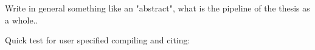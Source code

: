 

Write in general something like an "abstract", what is the pipeline of the thesis as a whole..

Quick test for user specified compiling and citing:\\
\cite{lutkepohl1996specification}\\
\citep{Rcoreteam}\\
\cite{Rcoreteam}\\



